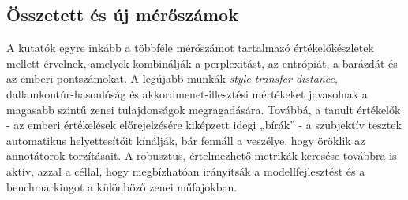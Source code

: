 \subsection{Összetett és új mérőszámok}
A kutatók egyre inkább a többféle mérőszámot tartalmazó értékelőkészletek mellett érvelnek, amelyek kombinálják a perplexitást, az entrópiát, a barázdát és az emberi pontszámokat.  A legújabb munkák \emph{style transfer distance}, dallamkontúr-hasonlóság és akkordmenet-illesztési mértékeket javasolnak a magasabb szintű zenei tulajdonságok megragadására.
Továbbá, a tanult értékelők - az emberi értékelések előrejelzésére kiképzett idegi „bírák” - a szubjektív tesztek automatikus helyettesítőit kínálják, bár fennáll a veszélye, hogy öröklik az annotátorok torzításait. A robusztus, értelmezhető metrikák keresése továbbra is aktív, azzal a céllal, hogy megbízhatóan irányítsák a modellfejlesztést és a benchmarkingot a különböző zenei műfajokban.